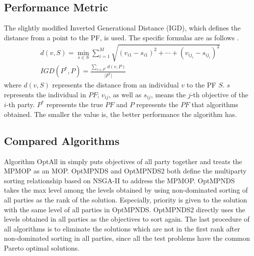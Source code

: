 \documentclass[preprint,12pt]{elsarticle}
\begin{document}
\subsection{Performance Metric}
The slightly modified Inverted Generational Distance (IGD), which defines the distance from a point to the PF, is used.
The specific formulas are as follows \cite{liu2020evolutionary}.
\begin{equation}\label{eq:IGD}
	\begin{aligned}
		 & d(v,S)=\min_{s \in S} \sum_{i=1}^{M} \sqrt{(v_{i1}-s_{i1})^2 + \cdots +(v_{ij_i}-s_{ij_i})^2} \\
		 & IGD(P^*,P) = \frac{\sum_{v \in P^*}d(v,P)}{\lvert P^* \rvert}
	\end{aligned}
\end{equation}
where $d(v,S)$ represents the distance from an individual $v$ to the PF $S$.
$s$ represents the individual in $PF$;
$v_{ij} $, as well as $s_{ij}$, means the $j$-th objective of the $i$-th party.
$P^*$ represents the true $PF$ and $P$ represents the $PF$ that algorithms obtained.
The smaller the value is, the better performance the algorithm has.

\subsection{Compared Algorithms}
Algorithm OptAll in \cite{liu2020evolutionary} simply puts objectives of all party together and treats the MPMOP as an MOP.
OptMPNDS and OptMPNDS2 both define the multiparty sorting relationship based on NSGA-II to address the MPMOP.
OptMPNDS takes the max level among the levels obtained by using non-dominated sorting of all parties as the rank of the solution.
Especially, priority is given to the solution with the same level of all parties in OptMPNDS.
OptMPNDS2 directly uses the levels obtained in all parties as the objectives to sort again.
The last procedure of all algorithms is to eliminate the solutions which are not in the first rank after non-dominated sorting in all parties, since all the test problems have the common Pareto optimal solutions.
\end{document}

